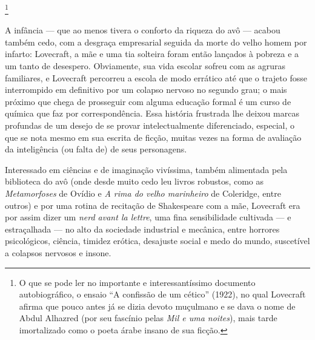 
\noindent{}\footnote{O que se pode ler no importante e interessantíssimo
  documento autobiográfico, o ensaio ``A confissão de um cético'' (1922),
  no qual Lovecraft afirma que pouco antes já se dizia devoto
  muçulmano e se dava o nome de Abdul Alhazred (por seu fascínio pelas
  \emph{Mil e uma noites}), mais tarde imortalizado como o poeta
  árabe insano de sua ficção.}

A infância --- que ao menos tivera o conforto da riqueza do avô ---
acabou também cedo, com a desgraça empresarial seguida da morte do velho
homem por infarto: Lovecraft, a mãe e uma tia solteira foram então
lançados à pobreza e a um tanto de desespero. Obviamente, sua vida
escolar sofreu com as agruras familiares, e Lovecraft percorreu a escola
de modo errático até que o trajeto fosse interrompido em definitivo por
um colapso nervoso no segundo grau; o mais próximo que chega de
prosseguir com alguma educação formal é um curso de química que faz por
correspondência. Essa história frustrada lhe deixou marcas profundas de
um desejo de se provar intelectualmente diferenciado, especial, o que se
nota mesmo em sua escrita de ficção, muitas vezes na forma de avaliação
da inteligência (ou falta de) de seus personagens.

Interessado em ciências e de imaginação vivíssima, também alimentada
pela biblioteca do avô (onde desde muito cedo leu livros robustos, como
as \emph{Metamorfoses} de Ovídio e \emph{A rima do velho marinheiro} de
Coleridge, entre outros) e por uma rotina de recitação de Shakespeare
com a mãe, Lovecraft era por assim dizer um \emph{nerd avant la lettre},
uma fina sensibilidade cultivada --- e estraçalhada --- no alto da
sociedade industrial e mecânica, entre horrores psicológicos, ciência,
timidez erótica, desajuste social e medo do mundo, suscetível a colapsos
nervosos e insone.

